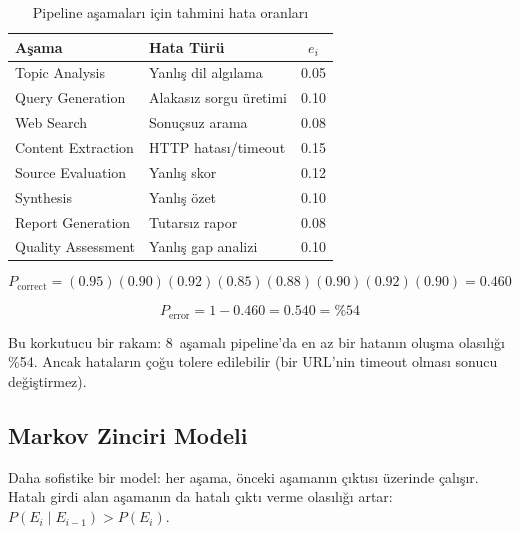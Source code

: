 \begin{table}[H]
\centering
\caption{Pipeline a\c{s}amalar{\i} i\c{c}in tahmini hata oranlar{\i}}
\label{tab:error_rates}
\begin{tabularx}{\textwidth}{lXc}
\toprule
\color{chapterBlue}\textbf{A\c{s}ama} & \color{chapterBlue}\textbf{Hata T\"{u}r\"{u}} & \color{chapterBlue}\textbf{$e_i$} \\
\midrule
Topic Analysis      & Yanl{\i}\c{s} dil alg{\i}lama     & 0.05 \\
Query Generation    & Alakas{\i}z sorgu \"{u}retimi       & 0.10 \\
Web Search          & Sonu\c{c}suz arama             & 0.08 \\
Content Extraction  & HTTP hatas{\i}/timeout         & 0.15 \\
Source Evaluation   & Yanl{\i}\c{s} skor                & 0.12 \\
Synthesis           & Yanl{\i}\c{s} \"{o}zet               & 0.10 \\
Report Generation   & Tutars{\i}z rapor              & 0.08 \\
Quality Assessment  & Yanl{\i}\c{s} gap analizi        & 0.10 \\
\bottomrule
\end{tabularx}
\end{table}

\begin{equation}
\label{eq:error_total}
P_{\text{correct}} = (0.95)(0.90)(0.92)(0.85)(0.88)(0.90)(0.92)(0.90) = 0.460
\end{equation}

\begin{equation}
\label{eq:error_prob}
P_{\text{error}} = 1 - 0.460 = 0.540 = \%54
\end{equation}

Bu korkutucu bir rakam: 8~a\c{s}amal{\i} pipeline'da en az bir hatan{\i}n olu\c{s}ma olas{\i}l{\i}\u{g}{\i} \%54. Ancak hatalar{\i}n \c{c}o\u{g}u tolere edilebilir (bir URL'nin timeout olmas{\i} sonucu de\u{g}i\c{s}tirmez).

\subsection{Markov Zinciri Modeli}

Daha sofistike bir model: her a\c{s}ama, \"{o}nceki a\c{s}aman{\i}n \c{c}{\i}kt{\i}s{\i} \"{u}zerinde \c{c}al{\i}\c{s}{\i}r. Hatal{\i} girdi alan a\c{s}aman{\i}n da hatal{\i} \c{c}{\i}kt{\i} verme olas{\i}l{\i}\u{g}{\i} artar: $P(E_i \mid E_{i-1}) > P(E_i)$.

